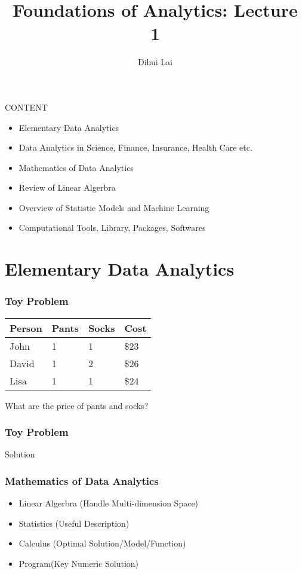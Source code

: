 \documentclass[notheorems, aspectratio=54]{beamer}
\title{Foundations of Analytics: Lecture 1}
\author{Dihui Lai}
\institute[WUSTL]{dlai@wustl.edu}
\begin{document}
\begin{frame}
    \titlepage
\end{frame}

\begin{frame}
CONTENT
\begin{itemize}
\item Elementary Data Analytics
\item Data Analytics in Science, Finance, Insurance, Health Care etc. 
\item Mathematics of Data Analytics
\item Review of Linear Algerbra 
\item Overview of Statistic Models and Machine Learning
\item Computational Tools, Library, Packages, Softwares
\end{itemize}
\end{frame}

\section{Elementary Data Analytics}
\begin{frame}
\frametitle{Toy Problem}
\begin{table}[]
\begin{tabular}{llll}
Person &Pants & Socks &Cost\\
\hline
John	&1	&1  &\$23\\
David	&1	&2  &\$26\\
Lisa	&1	&1  &\$24\\
\hline
\end{tabular}
\end{table}
What are the price of pants and socks?
\end{frame}


\begin{frame}
\frametitle{Toy Problem}
\begin{center}
Solution
\end{center}

\end{frame}


\begin{frame}
\frametitle{Mathematics of Data Analytics}
\begin{itemize}
\item Linear Algerbra (Handle Multi-dimension Space)
\item Statistics (Useful Description)
\item Calculus (Optimal Solution/Model/Function)
\item Program(Key Numeric Solution)
\end{itemize}
\end{frame}
\end{document}
